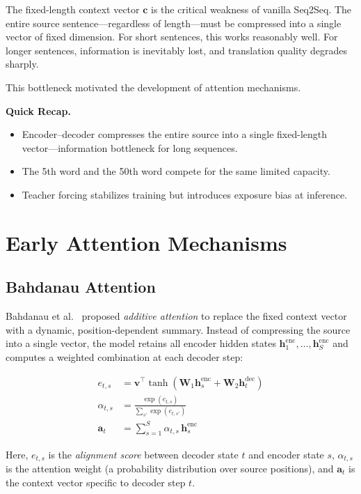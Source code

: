 The fixed-length context vector $\mathbf{c}$ is the critical weakness of vanilla Seq2Seq. The entire source sentence---regardless of length---must be compressed into a single vector of fixed dimension. For short sentences, this works reasonably well. For longer sentences, information is inevitably lost, and translation quality degrades sharply.

This bottleneck motivated the development of attention mechanisms.

\begin{quickrecap}
\textbf{Quick Recap.}
\begin{itemize}[nosep,leftmargin=1.5em]
  \item Encoder--decoder compresses the entire source into a single fixed-length vector---information bottleneck for long sequences.
  \item The 5th word and the 50th word compete for the same limited capacity.
  \item Teacher forcing stabilizes training but introduces exposure bias at inference.
\end{itemize}
\end{quickrecap}

\section{Early Attention Mechanisms}

\subsection{Bahdanau Attention}

Bahdanau et al.~\cite{bahdanau2015neural} proposed \emph{additive attention} to replace the fixed context vector with a dynamic, position-dependent summary. Instead of compressing the source into a single vector, the model retains all encoder hidden states $\mathbf{h}_1^{\text{enc}}, \ldots, \mathbf{h}_S^{\text{enc}}$ and computes a weighted combination at each decoder step:

\begin{align}
e_{t,s} &= \mathbf{v}^\top \tanh(\mathbf{W}_1 \mathbf{h}_s^{\text{enc}} + \mathbf{W}_2 \mathbf{h}_t^{\text{dec}}) \\
\alpha_{t,s} &= \frac{\exp(e_{t,s})}{\sum_{s'} \exp(e_{t,s'})} \\
\mathbf{a}_t &= \sum_{s=1}^{S} \alpha_{t,s}\, \mathbf{h}_s^{\text{enc}}
\end{align}

Here, $e_{t,s}$ is the \emph{alignment score} between decoder state $t$ and encoder state $s$, $\alpha_{t,s}$ is the attention weight (a probability distribution over source positions), and $\mathbf{a}_t$ is the context vector specific to decoder step $t$.

